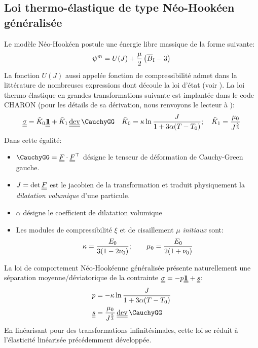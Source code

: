 \documentclass[10pt]{book}
\begin{document}
\begin{appendices}
\subsection{Loi thermo-élastique de type Néo-Hookéen généralisée}
Le modèle Néo-Hookéen postule une énergie libre massique de la forme suivante:
$$\psi^{m} = U(J) + \dfrac{\mu}{2}\left(\overline{B}_{\mathrm{I}} -3\right)$$
La fonction $U(J)$ aussi appelée fonction de compressibilité admet dans la littérature de nombreuses expressions dont découle la loi d'état (voir ). La loi thermo-élastique en grandes transformations suivante est implantée dans le code CHARON (pour les détails de sa dérivation, nous renvoyons le lecteur à \cite{simo2006computational}):
\begin{equation}
\SC=\tilde{K}_{0}\TU+\tilde{K}_{1}\dev\CauchyGG \quad \tilde{K}_{0}=\BulkModulus\ln\frac{\J}{1+3\alpha(T-T_{0})}; \quad \tilde{K}_{1}=\frac{\mu_{0}}{\J^{\frac{5}{3}}}
\label{eq:loi_grand_transfo}
\end{equation}
Dans cette égalité:
\begin{itemize}
\item $\CauchyGG=\GT\cdot\GT^{\top}$ désigne le tenseur de déformation de Cauchy-Green gauche.
\item $J=\det\underline{\underline{F}}$ est le jacobien de la transformation et traduit physiquement la \emph{dilatation volumique} d'une particule.
\item $\alpha$ désigne le coefficient de dilatation volumique 
\item Les modules de compressibilité $\xi$ et de cisaillement $\mu$ {\it initiaux} sont:
$$\kappa=\frac{E_{0}}{3(1-2\nu_{0})}; \qquad \mu_{0}=\frac{E_{0}}{2(1+\nu_{0})}$$
\end{itemize}
La loi de comportement Néo-Hookéenne généralisée présente naturellement une séparation moyenne/déviatorique de la contrainte $\underline{\underline{\sigma}} = -p\underline{\underline{1\!\!1}}+\underline{\underline{s}}$:
\begin{align}
p &= -\BulkModulus\ln\frac{\J}{1+3\alpha(T-T_{0})}\\\label{eq:devia_Neo_Hook}
\devia &= \frac{\mu_{0}}{\J^{\frac{5}{3}}}\dev\CauchyGG
\end{align}
En linéarisant pour des transformations infinitésimales, cette loi se réduit à l'élasticité linéarisée précédemment développée.\\


\end{appendices}
\end{document}
